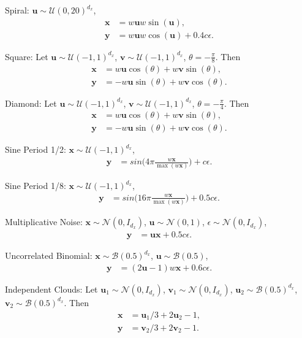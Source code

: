 \documentclass[11pt]{article}
\providecommand{\mb}[1]{\boldsymbol{#1}}
\providecommand{\mc}[1]{\mathcal{#1}}
\begin{document}
\begin{compactenum}
\item Spiral: $\mb{u} \sim \mc{U}(0,20)^{d_{x}}$,
\begin{align*}
\mb{x}&=w\mb{u}w\sin(\mb{u}),\\
\mb{y}&=w\mb{u}w\cos(\mb{u})+0.4c\epsilon.
\end{align*}
\item Square: Let $\mb{u} \sim \mc{U}(-1,1)^{d_{x}}$, $\mb{v} \sim \mc{U}(-1,1)^{d_{x}}$, $\theta=-\frac{\pi}{8}$. Then
\begin{align*}
\mb{x}&=w\mb{u} \cos(\theta) + w\mb{v} \sin(\theta),\\
\mb{y}&=-w\mb{u} \sin(\theta) + w\mb{v} \cos(\theta).
\end{align*}
\item Diamond: Let $\mb{u} \sim \mc{U}(-1,1)^{d_{x}}$, $\mb{v} \sim \mc{U}(-1,1)^{d_{x}}$, $\theta=-\frac{\pi}{4}$. Then
\begin{align*}
\mb{x}&=w\mb{u} \cos(\theta) + w\mb{v} \sin(\theta),\\
\mb{y}&=-w\mb{u} \sin(\theta) + w\mb{v} \cos(\theta).
\end{align*}
\item Sine Period 1/2: $\mb{x} \sim \mc{U}(-1,1)^{d_{x}}$,
\begin{align*}
\mb{y}&=sin \bigg( 4\pi \frac{w\mb{x}}{\max(w\mb{x})} \bigg)+c\epsilon.
\end{align*}
\item Sine Period 1/8: $\mb{x} \sim \mc{U}(-1,1)^{d_{x}}$,
\begin{align*}
\mb{y}&=sin\bigg(16\pi \frac{w\mb{x}}{\max(w\mb{x})}\bigg)+0.5c\epsilon.
\end{align*}
\item Multiplicative Noise: $\mb{x} \sim \mc{N}(0, I_{d_{x}})$, $\mb{u} \sim \mc{N}(0, 1)$, $\epsilon \sim \mc{N}(0, I_{d_{x}})$,
\begin{align*}
\mb{y}&=\mb{u}\mb{x}+0.5c\epsilon.
\end{align*}
\item Uncorrelated Binomial: $\mb{x} \sim \mc{B}(0.5)^{d_{x}}$, $\mb{u} \sim \mc{B}(0.5)$,
\begin{align*}
\mb{y}&=(2\mb{u}-1)w\mb{x}+0.6c\epsilon.
\end{align*}
\item Independent Clouds: Let $\mb{u}_{1} \sim \mc{N}(0,I_{d_{x}})$, $\mb{v}_{1} \sim \mc{N}(0,I_{d_{x}})$, $\mb{u}_{2} \sim \mc{B}(0.5)^{d_{x}}$, $\mb{v}_{2} \sim \mc{B}(0.5)^{d_{x}}$. Then
\begin{align*}
\mb{x}&=\mb{u}_{1}/3+2\mb{u}_{2}-1,\\
\mb{y}&=\mb{v}_{2}/3+2\mb{v}_{2}-1.
\end{align*}
\end{compactenum}
\end{document}
